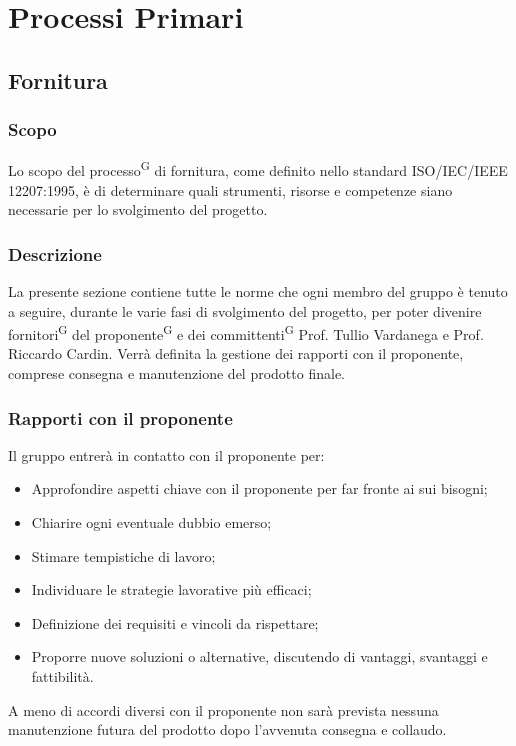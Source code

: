 \section{Processi Primari}
\subsection{Fornitura}
\subsubsection{Scopo}
Lo scopo del processo\textsuperscript{G} di fornitura, come definito nello standard ISO/IEC/IEEE 12207:1995, è di determinare quali strumenti, risorse e competenze siano necessarie per lo svolgimento del progetto. 

\subsubsection{Descrizione}
La presente sezione contiene tutte le norme che ogni membro del gruppo è tenuto a seguire, durante le varie fasi di svolgimento del progetto, per poter divenire fornitori\textsuperscript{G} del proponente\textsuperscript{G} \zd e dei committenti\textsuperscript{G} Prof. Tullio Vardanega e Prof. Riccardo Cardin. 
Verrà definita la gestione dei rapporti con il proponente, comprese consegna e manutenzione del prodotto finale.

\subsubsection{Rapporti con il proponente}
Il gruppo entrerà in contatto con il proponente \zd per:
\begin{itemize}
	\item Approfondire aspetti chiave con il proponente per far fronte ai sui bisogni; 
	\item Chiarire ogni eventuale dubbio emerso;
	\item Stimare tempistiche di lavoro;
	\item Individuare le strategie lavorative più efficaci;
	\item Definizione dei requisiti e vincoli da rispettare;
	\item Proporre nuove soluzioni o alternative, discutendo di vantaggi, svantaggi e fattibilità.
\end{itemize}
A meno di accordi diversi con il proponente non sarà prevista nessuna manutenzione futura del prodotto dopo l'avvenuta consegna e collaudo.

